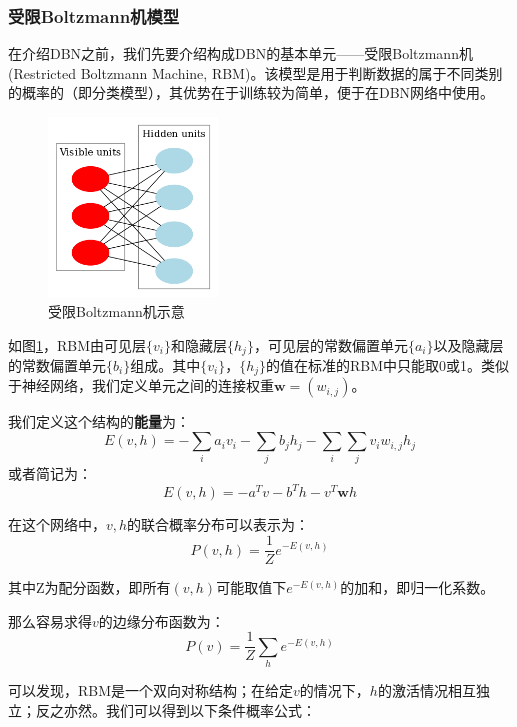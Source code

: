 \subsubsection{受限Boltzmann机模型}
在介绍DBN之前，我们先要介绍构成DBN的基本单元——受限Boltzmann机(Restricted Boltzmann Machine, RBM)。该模型是用于判断数据的属于不同类别的概率的（即分类模型），其优势在于训练较为简单，便于在DBN网络中使用。

\begin{figure}[htbp]
   \centering
   \includegraphics[width=0.4\textwidth]{RestrictedBoltzmannMachine.png} %
   \caption{受限Boltzmann机示意}
   \label{fig:rbm}
\end{figure}

如图\ref{fig:rbm}，RBM由可见层$\{v_i\}$和隐藏层$\{h_j\}$，可见层的常数偏置单元$\{a_i\}$以及隐藏层的常数偏置单元$\{b_i\}$组成。其中$\{v_i\}$，$\{h_j\}$的值在标准的RBM中只能取0或1。类似于神经网络，我们定义单元之间的连接权重$\mathbf{w} = (w_{i,j})$。

我们定义这个结构的\textbf{能量}为：
\begin{equation}
E(v,h) = - \sum_i a_i v_i - \sum_j b_j h_j - \sum_i\sum_j v_i w_{i,j} h_j
\end{equation}
或者简记为：
$$E(v,h) = -a^T v -b^T h - v^T \mathbf{w} h$$

在这个网络中，$v,h$的联合概率分布可以表示为：
\begin{equation}
P(v,h) = \dfrac{1}{Z} e^{-E(v,h)}
\end{equation}

其中Z为配分函数，即所有$(v,h)$可能取值下$e^{-E(v,h)}$的加和，即归一化系数。

那么容易求得$v$的边缘分布函数为：
\begin{equation}
P(v) = \dfrac{1}{Z} \sum_h e^{-E(v,h)}
\end{equation}

可以发现，RBM是一个双向对称结构；在给定$v$的情况下，$h$的激活情况相互独立；反之亦然。我们可以得到以下条件概率公式：

